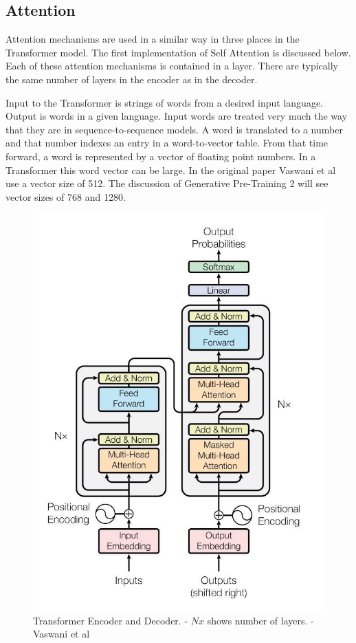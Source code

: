 \subsection{Attention}
Attention mechanisms are used in a similar way in three places in the Transformer model. The first implementation of Self Attention is discussed below. Each of these attention mechanisms is contained in a layer. There are typically the same number of layers in the encoder as in the decoder.

Input to the Transformer is strings of words from a desired input language. Output is words in a given language. Input words are treated very much the way that they are in sequence-to-sequence models. A word is translated to a number and that number indexes an entry in a word-to-vector table. From that time forward, a word is represented by a vector of floating point numbers. In a Transformer this word vector can be large. In the original paper Vaswani et al \cite{Vaswani2017AttentionIA} use a vector size of 512. The discussion of Generative Pre-Training 2 will see vector sizes of 768 and 1280.

\begin{figure}[H]
	\begin{center}
		
		
		\includegraphics[scale=1.5]{diagram-mat04}
	\end{center}
	\caption[Transformer Encoder and Decoder]{Transformer Encoder and Decoder. - $Nx$ shows number of layers. - Vaswani et al \cite{Vaswani2017AttentionIA}}
	
	
\end{figure}

